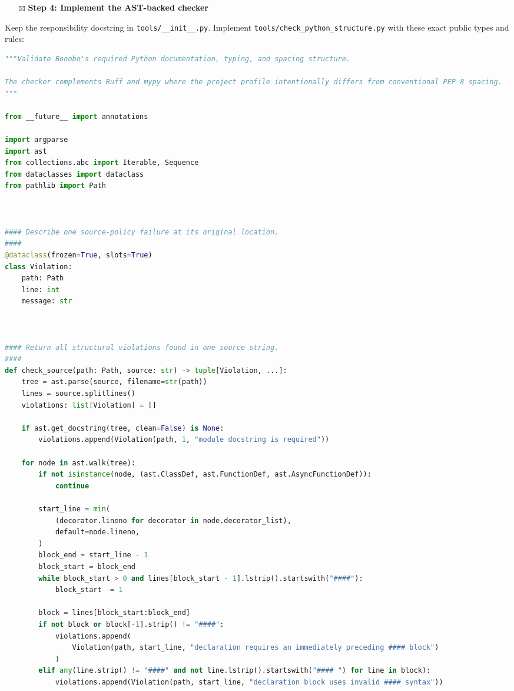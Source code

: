 \documentclass[
  letterpaper,
]{article}
\providecommand{\tightlist}{%
  \setlength{\itemsep}{0pt}\setlength{\parskip}{0pt}}
\begin{document}
\begin{itemize}
\tightlist
\item[$\boxtimes$]
  \textbf{Step 4: Implement the AST-backed checker}
\end{itemize}

Keep the responsibility docstring in \nolinkurl{tools/__init__.py}. Implement
\nolinkurl{tools/check_python_structure.py} with these exact public types and rules:

\begin{lstlisting}[language=Python]
"""Validate Bonobo's required Python documentation, typing, and spacing structure.

The checker complements Ruff and mypy where the project profile intentionally differs from conventional PEP 8 spacing.
"""

from __future__ import annotations

import argparse
import ast
from collections.abc import Iterable, Sequence
from dataclasses import dataclass
from pathlib import Path



#### Describe one source-policy failure at its original location.
####
@dataclass(frozen=True, slots=True)
class Violation:
    path: Path
    line: int
    message: str



#### Return all structural violations found in one source string.
####
def check_source(path: Path, source: str) -> tuple[Violation, ...]:
    tree = ast.parse(source, filename=str(path))
    lines = source.splitlines()
    violations: list[Violation] = []

    if ast.get_docstring(tree, clean=False) is None:
        violations.append(Violation(path, 1, "module docstring is required"))

    for node in ast.walk(tree):
        if not isinstance(node, (ast.ClassDef, ast.FunctionDef, ast.AsyncFunctionDef)):
            continue

        start_line = min(
            (decorator.lineno for decorator in node.decorator_list),
            default=node.lineno,
        )
        block_end = start_line - 1
        block_start = block_end
        while block_start > 0 and lines[block_start - 1].lstrip().startswith("####"):
            block_start -= 1

        block = lines[block_start:block_end]
        if not block or block[-1].strip() != "####":
            violations.append(
                Violation(path, start_line, "declaration requires an immediately preceding #### block")
            )
        elif any(line.strip() != "####" and not line.lstrip().startswith("#### ") for line in block):
            violations.append(Violation(path, start_line, "declaration block uses invalid #### syntax"))


\end{lstlisting}
\end{document}
